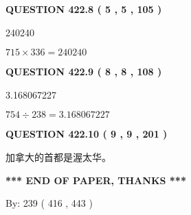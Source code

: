 \documentclass{ctexart}
\begin{document}
{\textbf{\Large{QUESTION
422.8 
 ( 5 , 5 , 105 )
}}}
  
  
 
 
\noindent{}

240240
 
 
 
 
\noindent{}

$ %
715 \times  %
336=   %
240240$
 
 
  
\vspace{0.2in}
  
{\textbf{\Large{QUESTION
422.9 
 ( 8 , 8 , 108 )
}}}
  
  
 
 
\noindent{}

3.168067227
 
 
 
 
\noindent{}

$ %
754 \div  %
238=   %
3.168067227$
 
 
  
\vspace{0.2in}
  
{\textbf{\Large{QUESTION
422.10 
 ( 9 , 9 , 201 )
}}}
  
  
 
 
\noindent{}
 
 
加拿大的首都是渥太华。
 
 
 
 
   
   
 \vspace{0.2in}
 
   
   
   
   
\vspace{1.0in} 
{\textbf{\large{ *** END OF PAPER, THANKS *** }}} 
   
   
\hspace{1.0in} By: 
 239 ( 416 ,  443 )
   
   
   
   
\newpage 
\setcounter{page}{ 
   423001 } 
   
   
   
\end{document}
